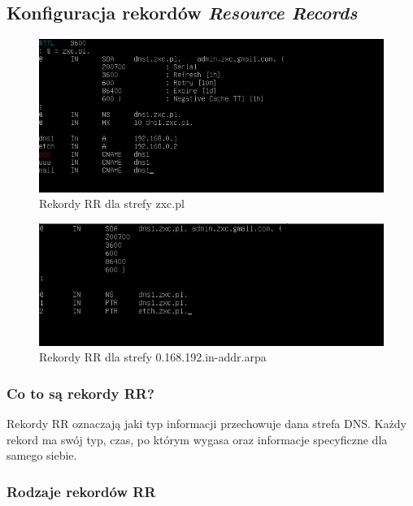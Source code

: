 \documentclass[12pt, a4paper]{article}
\begin{document}
    \subsection{Konfiguracja rekordów \textit{Resource Records}}
        \begin{figure}[!h]
            \centering
            \includegraphics[width = 1.05\textwidth]{5.PNG}
            \caption{Rekordy RR dla strefy zxc.pl}
            \label{fig:testpl}
        \end{figure}
        \newpage
        \begin{figure}[!h]
            \centering
            \includegraphics[width = \textwidth]{6.PNG}
            \caption{Rekordy RR dla strefy 0.168.192.in-addr.arpa}
            \label{fig:arpa}
        \end{figure}

        \subsubsection{Co to są rekordy RR?}
            Rekordy RR oznaczają jaki typ informacji przechowuje dana strefa DNS. Każdy rekord ma swój typ, czas, po którym wygasa oraz informacje specyficzne dla samego siebie.
            
        \subsubsection{Rodzaje rekordów RR}
\end{document}
